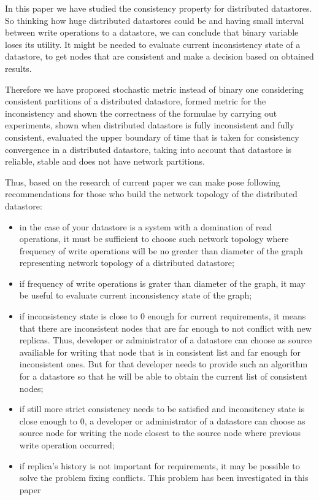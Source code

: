 \documentclass{llncs}
\begin{document}
In this paper we have studied the consistency property for distributed datastores.
So thinking how huge distributed datastores could be and having small interval between write operations to a datastore, we can conclude that binary variable loses its utility.
It might be needed to evaluate current inconsistency state of a datastore, to get nodes that are consistent and make a decision based on obtained results.

Therefore we have proposed stochastic metric instead of binary one considering consistent partitions of a distributed datastore, formed metric for the inconsistency and shown the correctness of the formulae by carrying out experiments, shown when distributed datastore is fully inconsistent and fully consistent, evaluated the upper boundary of time that is taken for consistency convergence in a distributed datastore, taking into account that datastore is reliable, stable and does not have network partitions.


Thus, based on the research of current paper we can make pose following recommendations for those who build the network topology of the distributed datastore:

\begin{itemize}
\item in the case of your datastore is a system with a domination of read operations, it must be sufficient to choose such network topology where frequency of write operations will be no greater than diameter of the graph representing network topology of a distributed datastore;

\item if frequency of write operations is grater than diameter of the graph, it may be useful to evaluate current inconsistency state of the graph;

\item if inconsistency state is close to 0 enough for current requirements, it means that there are inconsistent nodes that are far enough to not conflict with new replicas. Thus, developer or administrator of a datastore  can choose as source availiable for writing that node that is in consistent list and far enough for inconsistent ones. But for that developer needs to provide such an algorithm for a datastore so that he will be able to obtain the current list of consistent nodes;

\item if still more strict consistency needs to be satisfied and inconsitency state is close enough to 0, a developer or administrator of a datastore can choose as source node for writing the node closest to the source node where previous write operation occurred;

\item if replica's history is not important for requirements, it may be possible to solve the problem fixing conflicts. This problem has been investigated in this paper \cite{bib:c_ts}

\end{itemize}
\end{document}
